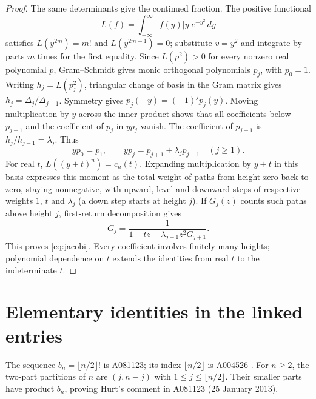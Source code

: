 \documentclass[11pt]{article}
\begin{document}
\begin{proof}
The same determinants give the continued fraction. The positive functional
\[
 L(f)=\int_{-\infty}^{\infty}f(y)|y|e^{-y^2}\,dy
\]
satisfies $L(y^{2m})=m!$ and $L(y^{2m+1})=0$; substitute $v=y^2$
and integrate by parts $m$ times for the first equality.
Since $L(p^2)>0$ for every nonzero real polynomial $p$,
Gram--Schmidt gives monic orthogonal polynomials $p_j$, with $p_0=1$.
Writing $h_j=L(p_j^2)$, triangular change of basis in the Gram matrix
gives $h_j=\Delta_j/\Delta_{j-1}$. Symmetry gives
$p_j(-y)=(-1)^jp_j(y)$. Moving multiplication by $y$ across the inner
product shows that all coefficients below $p_{j-1}$ and the coefficient
of $p_j$ in $yp_j$ vanish. The coefficient of $p_{j-1}$ is
$h_j/h_{j-1}=\lambda_j$. Thus
\[
 yp_0=p_1,\qquad yp_j=p_{j+1}+\lambda_jp_{j-1}\quad(j\geq1).
\]
For real $t$, $L((y+t)^n)=c_n(t)$. Expanding multiplication by $y+t$
in this basis expresses this moment as the total weight of paths from
height zero back to zero, staying nonnegative, with upward, level and
downward steps of respective weights $1$, $t$ and $\lambda_j$ (a down
step starts at height $j$). If $G_j(z)$ counts such paths above height
$j$, first-return decomposition gives
\[
 G_j=\frac{1}{1-tz-\lambda_{j+1}z^2G_{j+1}}.
\]
This proves \eqref{eq:jacobi}. Every coefficient involves finitely many
heights; polynomial dependence on $t$ extends the identities from real
$t$ to the indeterminate $t$.
\end{proof}

\section{Elementary identities in the linked entries}
The sequence $b_n=\lfloor n/2\rfloor!$ is A081123; its index
$\lfloor n/2\rfloor$ is A004526 \cite{oeis-b}. For $n\geq2$, the
two-part partitions of $n$ are $(j,n-j)$ with $1\leq j\leq\lfloor n/2\rfloor$.
Their smaller parts have product $b_n$, proving Hurt's comment in
A081123 (25 January 2013).
\end{document}
